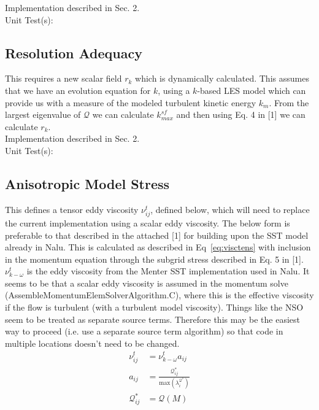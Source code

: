 \documentclass[12pt]{article}
\begin{document}
\noindent Implementation described in Sec. 2. \\

\noindent Unit Test(s): \\



\subsection{Resolution Adequacy}
This requires a new scalar field $r_k$ which is dynamically calculated.  This assumes that we have an evolution equation for $k$, using a $k$-based LES model which can provide us with a measure of the modeled turbulent kinetic energy $k_m$.  From the largest eigenvalue of $\mathcal{Q}$ we can calculate $k_{max}^{sf}$ and then using Eq. 4 in [1] we can calculate $r_k$. \\

\noindent Implementation described in Sec. 2. \\

\noindent Unit Test(s): \\



\subsection{Anisotropic Model Stress}
This defines a tensor eddy viscosity $\nu_{ij}^t$, defined below, which will need to replace the current implementation using a scalar eddy viscosity.  The below form is preferable to that described in the attached [1] for building upon the SST model already in Nalu.  This is calculated as described in Eq~\ref{eq:visctens} with inclusion in the momentum equation through the subgrid stress described in Eq. 5 in [1]. $\nu_{k-\omega}^t$ is the eddy viscosity from the Menter SST implementation used in Nalu.  It seems to be that a scalar eddy viscosity is assumed in the momentum solve (AssembleMomentumElemSolverAlgorithm.C), where this is the effective viscosity if the flow is turbulent (with a turbulent model viscosity).  Things like the NSO seem to be treated as separate source terms.  Therefore this may be the easiest way to proceed (i.e. use a separate source term algorithm) so that code in multiple locations doesn't need to be changed.
\begin{equation}
\label{eq:visctens}
\begin{aligned}
\nu_{ij}^t &= \nu_{k-\omega}^t a_{ij} \\
a_{ij} &= \frac{\mathcal{Q}_{ij}^*}{\mathrm{max} (\lambda_i^{\mathcal{Q}^*})} \\
\mathcal{Q}_{ij}^* &= \mathcal{Q}(M)
\end{aligned}
\end{equation}
\end{document}

